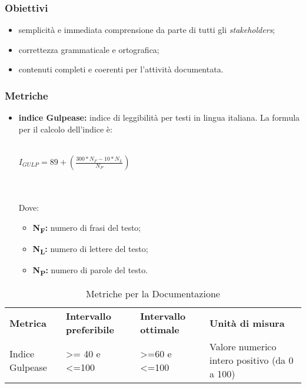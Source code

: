 \subsubsection{Obiettivi}
\begin{itemize}
	\item semplicità e immediata comprensione da parte di tutti gli \textit{stakeholders\glo};
	\item correttezza grammaticale e ortografica;
	\item contenuti completi e coerenti per l'attività documentata.
\end{itemize}
\subsubsection{Metriche}
\begin{itemize}
	\item \textbf{indice Gulpease:} indice di leggibilità per testi in lingua italiana. La formula per il calcolo dell'indice è:\\\\
	\centerline{
		\begin{math}
		I_{GULP}=89+(\frac{300*N_F-10*N_L}{N_P})
		\end{math}
	}
	\\\\Dove:
	\begin{itemize}
		\item \textbf{N\textsubscript{F}:} numero di frasi del testo;
		\item \textbf{N\textsubscript{L}:} numero di lettere del testo;
		\item \textbf{N\textsubscript{P}:} numero di parole del testo.
	\end{itemize}
\end{itemize}

\renewcommand{\arraystretch}{2.2}
\begin{longtable}{|C{2.5cm}|C{3.25cm}|C{3.25cm}|C{3cm}|}
	
	\caption{Metriche per la Documentazione}\\
	\hline
	
	\textbf{Metrica} & \textbf{Intervallo preferibile}  & \textbf{Intervallo ottimale} & \textbf{Unità di misura}
	\tabularnewline
	\endfirsthead
	
	Indice Gulpease & >= 40 e <=100  & >=60 e <=100 & Valore numerico intero positivo (da 0 a 100) \\ 

\end{longtable}




